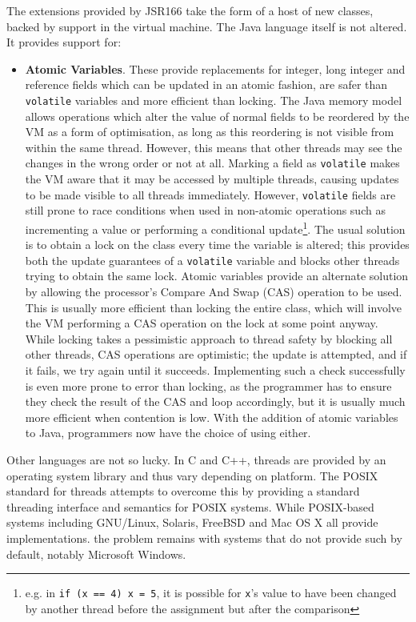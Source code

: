 The extensions provided by JSR166 take the form of a host of new
classes, backed by support in the virtual machine.  The Java language
itself is not altered.  It provides support for:

\begin{itemize}
\item \textbf{Atomic Variables}.  These provide replacements for
  integer, long integer and reference fields which can be updated in
  an atomic fashion, are safer than \texttt{volatile} variables and
  more efficient than locking.  The Java memory model allows
  operations which alter the value of normal fields to be reordered by
  the VM as a form of optimisation, as long as this reordering is not
  visible from within the same thread.  However, this means that other
  threads may see the changes in the wrong order or not at all.
  Marking a field as \texttt{volatile} makes the VM aware that it may
  be accessed by multiple threads, causing updates to be made visible
  to all threads immediately.  However, \texttt{volatile} fields are
  still prone to race conditions when used in non-atomic operations
  such as incrementing a value or performing a conditional
  update\footnote{e.g. in \texttt{if (x == 4) x = 5}, it is possible
    for \texttt{x}'s value to have been changed by another thread
    before the assignment but after the comparison}.  The usual
  solution is to obtain a lock on the class every time the variable is
  altered; this provides both the update guarantees of a
  \texttt{volatile} variable and blocks other threads trying to obtain
  the same lock.  Atomic variables provide an alternate solution by
  allowing the processor's Compare And Swap (CAS) operation to be
  used.  This is usually more efficient than locking the entire class,
  which will involve the VM performing a CAS operation on the lock at
  some point anyway.  While locking takes a pessimistic approach to
  thread safety by blocking all other threads, CAS operations are
  optimistic; the update is attempted, and if it fails, we try again
  until it succeeds.  Implementing such a check successfully is even
  more prone to error than locking, as the programmer has to ensure
  they check the result of the CAS and loop accordingly, but it is
  usually much more efficient when contention is low.  With the
  addition of atomic variables to Java, programmers now have the
  choice of using either.
\end{itemize}

Other languages are not so lucky.  In C and C++, threads are provided
by an operating system library and thus vary depending on platform.
The POSIX standard for threads attempts to overcome this by providing
a standard threading interface and semantics for POSIX systems.  While
POSIX-based systems including GNU/Linux, Solaris, FreeBSD and Mac OS X
all provide implementations. the problem remains with systems that do
not provide such by default, notably Microsoft Windows.

